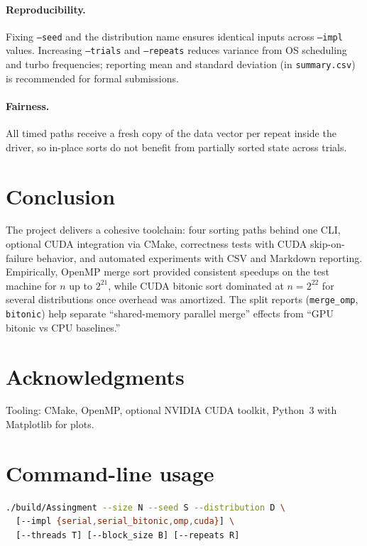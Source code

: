\documentclass[11pt,a4paper]{article}
\begin{document}
\paragraph{Reproducibility.}
Fixing \texttt{--seed} and the distribution name ensures identical inputs across \texttt{--impl} values. Increasing \texttt{--trials} and \texttt{--repeats} reduces variance from OS scheduling and turbo frequencies; reporting mean and standard deviation (in \texttt{summary.csv}) is recommended for formal submissions.

\paragraph{Fairness.}
All timed paths receive a fresh copy of the data vector per repeat inside the driver, so in-place sorts do not benefit from partially sorted state across trials.

\section{Conclusion}

The project delivers a cohesive toolchain: four sorting paths behind one CLI, optional CUDA integration via CMake, correctness tests with CUDA skip-on-failure behavior, and automated experiments with CSV and Markdown reporting. Empirically, OpenMP merge sort provided consistent speedups on the test machine for $n$ up to $2^{21}$, while CUDA bitonic sort dominated at $n=2^{22}$ for several distributions once overhead was amortized. The split reports (\texttt{merge\_omp}, \texttt{bitonic}) help separate ``shared-memory parallel merge'' effects from ``GPU bitonic vs CPU baselines.''

\section*{Acknowledgments}
Tooling: CMake, OpenMP, optional NVIDIA CUDA toolkit, Python~3 with Matplotlib for plots.

\appendix
\section{Command-line usage}

\begin{lstlisting}[language=bash]
./build/Assingment --size N --seed S --distribution D \
  [--impl {serial,serial_bitonic,omp,cuda}] \
  [--threads T] [--block_size B] [--repeats R]
\end{lstlisting}
\end{document}
